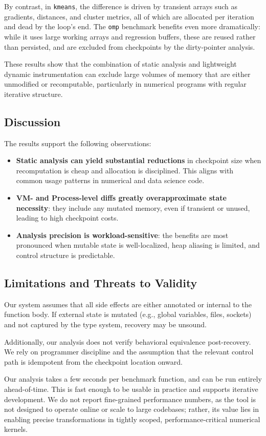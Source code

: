 By contrast, in \texttt{kmeans}, the difference is driven by transient arrays such as gradients, distances, and cluster metrics, all of which are allocated per iteration and dead by the loop's end. The \texttt{omp} benchmark benefits even more dramatically: while it uses large working arrays and regression buffers, these are reused rather than persisted, and are excluded from checkpoints by the dirty-pointer analysis.

These results show that the combination of static analysis and lightweight dynamic instrumentation can exclude large volumes of memory that are either unmodified or recomputable, particularly in numerical programs with regular iterative structure.

\subsection{Discussion}

The results support the following observations:

\begin{itemize}
  \item \textbf{Static analysis can yield substantial reductions} in checkpoint size when recomputation is cheap and allocation is disciplined. This aligns with common usage patterns in numerical and data science code.
  \item \textbf{VM- and Process-level diffs greatly overapproximate state necessity}: they include any mutated memory, even if transient or unused, leading to high checkpoint costs.
  \item \textbf{Analysis precision is workload-sensitive}: the benefits are most pronounced when mutable state is well-localized, heap aliasing is limited, and control structure is predictable.
\end{itemize}

\subsection{Limitations and Threats to Validity}
\label{sec:threats}

Our system assumes that all side effects are either annotated or internal to the function body. If external state is mutated (e.g., global variables, files, sockets) and not captured by the type system, recovery may be unsound.

Additionally, our analysis does not verify behavioral equivalence post-recovery. We rely on programmer discipline and the assumption that the relevant control path is idempotent from the checkpoint location onward.

Our analysis takes a few seconds per benchmark function, and can be run entirely ahead-of-time. This is fast enough to be usable in practice and supports iterative development. We do not report fine-grained performance numbers, as the tool is not designed to operate online or scale to large codebases; rather, its value lies in enabling precise transformations in tightly scoped, performance-critical numerical kernels.
